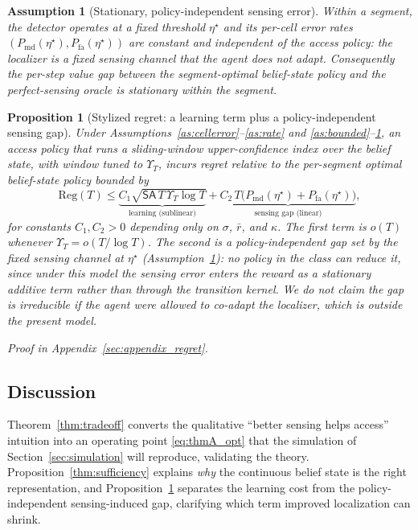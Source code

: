 \documentclass[journal]{IEEEtran}
\newtheorem{proposition}{Proposition}
\newtheorem{assumption}{Assumption}
\newcommand{\Pmd}{P_{\mathrm{md}}}         %
\newcommand{\Pfa}{P_{\mathrm{fa}}}         %
\newcommand{\thr}{\eta}                    %
\newcommand{\bigT}{T}                      %
\newcommand{\regret}{\mathrm{Reg}}         %
\begin{document}
\begin{assumption}[Stationary, policy-independent sensing error]
\label{as:stationary_sensing}
Within a segment, the detector operates at a fixed threshold $\thr^\star$ and
its per-cell error rates $(\Pmd(\thr^\star),\Pfa(\thr^\star))$ are constant
and \emph{independent of the access policy}: the localizer is a fixed sensing
channel that the agent does not adapt. Consequently the per-step value gap
between the segment-optimal belief-state policy and the perfect-sensing
oracle is stationary within the segment.
\end{assumption}

\begin{proposition}[Stylized regret: a learning term plus a policy-independent sensing gap]
\label{thm:regret}
Under Assumptions~\ref{as:cellerror}--\ref{as:rate} and
\ref{as:bounded}--\ref{as:stationary_sensing}, an access policy that runs a
sliding-window upper-confidence index over the belief state, with window
tuned to $\Upsilon_{\bigT}$, incurs regret relative to the per-segment
optimal belief-state policy bounded by
\begin{equation}
\regret(\bigT)\le
\underbrace{C_1\sqrt{\mathsf{SA}\,\bigT\,\Upsilon_{\bigT}\log\bigT}}
_{\text{learning (sublinear)}}
+
\underbrace{C_2\,\bigT\big(\Pmd(\thr^{\star}){+}\Pfa(\thr^{\star})\big)}
_{\text{sensing gap (linear)}},
\label{eq:thmC}
\end{equation}
for constants $C_1,C_2>0$ depending only on $\sigma$, $\bar r$, and $\kappa$.
The first term is $o(\bigT)$ whenever $\Upsilon_{\bigT}=o(\bigT/\log\bigT)$.
The second is a \emph{policy-independent} gap set by the fixed sensing channel
at $\thr^\star$ (Assumption~\ref{as:stationary_sensing}): no policy in the
class can reduce it, since under this model the sensing error enters the
reward as a stationary additive term rather than through the transition
kernel. We do not claim the gap is irreducible if the agent were allowed to
co-adapt the localizer, which is outside the present model.
\end{proposition}
\noindent\emph{Proof in Appendix~\ref{sec:appendix_regret}.}

\subsection{Discussion}
\label{subsec:theory_discussion}
Theorem~\ref{thm:tradeoff} converts the qualitative ``better sensing helps
access'' intuition into an operating point \eqref{eq:thmA_opt} that the
simulation of Section~\ref{sec:simulation} will reproduce, validating the
theory. Proposition~\ref{thm:sufficiency} explains \emph{why} the continuous
belief state is the right representation, and Proposition~\ref{thm:regret}
separates the learning cost from the policy-independent sensing-induced gap,
clarifying which term improved localization can shrink.
\end{document}
